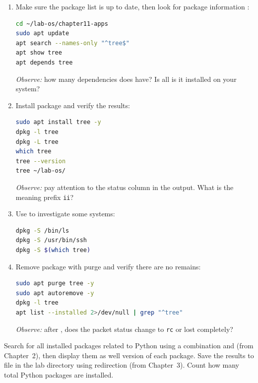 \begin{enumerate}
\item Make sure the package list is up to date, then look for package information :
\begin{lstlisting}[language=bash, caption={Update and search for package information}]
cd ~/lab-os/chapter11-apps
sudo apt update
apt search --names-only "^tree$"
apt show tree
apt depends tree
\end{lstlisting}
\textit{Observe:} how many dependencies does  have? Is all
is it installed on your system?

\item Install package  and verify the results:
\begin{lstlisting}[language=bash, caption={Install and verify the tree package}]
sudo apt install tree -y
dpkg -l tree
dpkg -L tree
which tree
tree --version
tree ~/lab-os/
\end{lstlisting}
\textit{Observe:} pay attention to the status column in the  output. What is the meaning
prefix \texttt{ii}?

\item Use  to investigate some  systems:
\begin{lstlisting}[language=bash, caption={Search for the package owner of the file}]
dpkg -S /bin/ls
dpkg -S /usr/bin/ssh
dpkg -S $(which tree)
\end{lstlisting}

\item Remove package  with purge and verify there are no remains:
\begin{lstlisting}[language=bash, caption={Remove packages and verify remaining}]
sudo apt purge tree -y
sudo apt autoremove -y
dpkg -l tree
apt list --installed 2>/dev/null | grep "^tree"
\end{lstlisting}
\textit{Observe:} after , does the packet status change to
\texttt{rc} or lost completely?
\end{enumerate}

\begin{challengebox}
Search for all installed packages related to Python using a combination
 and  (from Chapter~2), then display them as well
version of each package. Save the results to file  in the lab directory using redirection (from Chapter~3). Count how many total Python packages are installed.
\end{challengebox}

